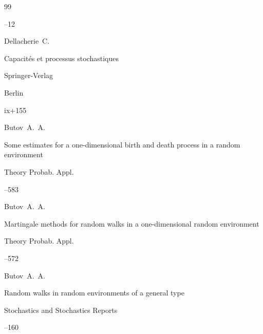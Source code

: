 \begin{thebibliography}{99}

--12 






\by Dellacherie~C.

\book Capacit\'es et processus stochastiques

\publ Springer-Verlag

\publaddr Berlin


\totalpages  ix+155








\by Butov~A.~A.

\paper Some estimates for a one-dimensional birth and death process in a random environment

\jour Theory Probab. Appl. 



--583 






\by Butov~A.~A.

\paper Martingale methods for random walks in a one-dimensional random environment

\jour Theory Probab. Appl. 



--572 






\by Butov~A.~A.

\paper  Random walks in random environments of a general type

\jour Stochastics and Stochastics Reports 


--160 






\end{thebibliography}
